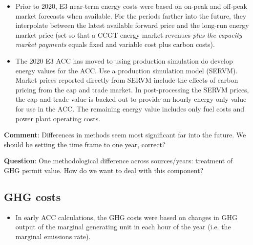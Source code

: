 \documentclass[11pt]{article}
\begin{document}
\begin{itemize}
\begin{itemize}
\item Prior to 2020, E3 near-term energy costs were based on on-peak and off-peak market forecasts when available.
For the periods farther into the future, they interpolate between the latest available forward price and the long-run energy market price (set so that a CCGT energy market revenues \textit{plus the capacity market payments} equals fixed and variable cost plus carbon costs).




\item  The 2020 E3 ACC has moved to using production simulation do develop energy values for the ACC. Use a  production simulation model (SERVM).   Market prices reported directly from SERVM include the effects of carbon pricing from the cap and trade market. In post-processing the SERVM prices, the cap and trade value is backed out to provide an hourly energy only value for use in the ACC. The remaining energy value includes only fuel costs and power plant operating costs.

\end{itemize}

\textbf{Comment}: Differences in methods seem most significant far into the future. We should be setting the time frame to one year, correct?

\textbf{Question}: One methodological difference across sources/years: treatment of GHG permit value. How do we want to deal with this component?


\subsection{GHG costs}

\begin{itemize}

\item In early ACC calculations, the GHG costs were based on changes in GHG output of the marginal generating unit in each hour of the year (i.e. the marginal emissions rate). 


\end{itemize}
\end{itemize}
\end{document}
